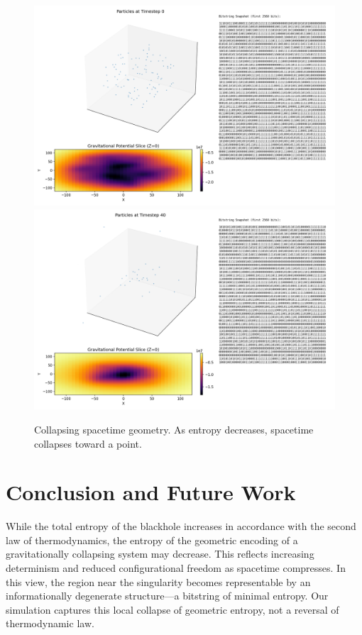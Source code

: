 \documentclass[11pt]{article}
\begin{document}
\begin{figure}[h!]
  \centering
  \includegraphics[width=1.0\textwidth]{figures/collapse_0.png}
  \includegraphics[width=1.0\textwidth]{figures/collapse_40.png}
  \caption{Collapsing spacetime geometry. As entropy decreases, spacetime collapses toward a point.}
  \label{fig:vanishing_entropy}
\end{figure}

\section{Conclusion and Future Work}

While the total entropy of the blackhole increases in accordance with the second law of thermodynamics, the entropy of the geometric encoding of a gravitationally collapsing system may decrease. This reflects increasing determinism and reduced configurational freedom as spacetime compresses. In this view, the region near the singularity becomes representable by an informationally degenerate structure—a bitstring of minimal entropy. Our simulation captures this local collapse of geometric entropy, not a reversal of thermodynamic law.
\end{document}
